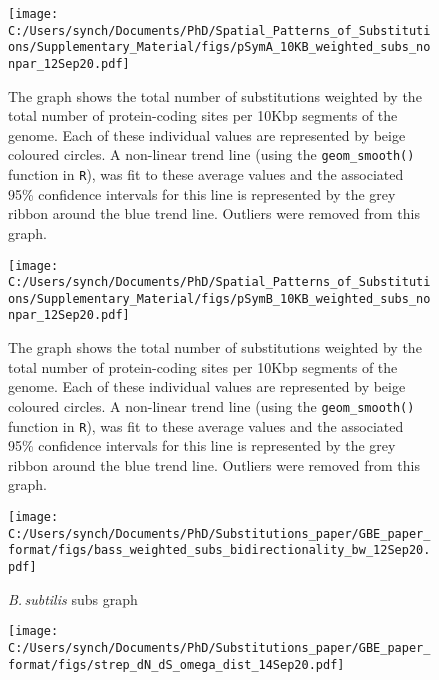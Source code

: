 \documentclass[12pt]{article}
\newcommand{\bass}{\textit{B.\,subtilis}\xspace}
\begin{document}
\begin{figure}[h]
	\begin{center}
		\texttt{[image: C:/Users/synch/Documents/PhD/Spatial\_Patterns\_of\_Substitutions/Supplementary\_Material/figs/pSymA\_10KB\_weighted\_subs\_nonpar\_12Sep20.pdf]}
		\caption{\label{fig:pSymA_nonpar}The graph shows the total number of substitutions weighted by the total number of protein-coding sites per 10Kbp segments of the genome. Each of these individual values are represented by beige coloured circles. A non-linear trend line (using the \texttt{geom\_smooth()} function in \texttt{R}), was fit to these average values and the associated 95\% confidence intervals for this line is represented by the grey ribbon around the blue trend line. Outliers were removed from this graph.}
	\end{center}
\end{figure}

\begin{figure}[h]
	\begin{center}
		\texttt{[image: C:/Users/synch/Documents/PhD/Spatial\_Patterns\_of\_Substitutions/Supplementary\_Material/figs/pSymB\_10KB\_weighted\_subs\_nonpar\_12Sep20.pdf]}
		\caption{\label{fig:pSymB_nonpar}The graph shows the total number of substitutions weighted by the total number of protein-coding sites per 10Kbp segments of the genome. Each of these individual values are represented by beige coloured circles. A non-linear trend line (using the \texttt{geom\_smooth()} function in \texttt{R}), was fit to these average values and the associated 95\% confidence intervals for this line is represented by the grey ribbon around the blue trend line. Outliers were removed from this graph.}
	\end{center}
\end{figure}


\begin{figure}[h]
	\begin{center}
		\texttt{[image: C:/Users/synch/Documents/PhD/Substitutions\_paper/GBE\_paper\_format/figs/bass\_weighted\_subs\_bidirectionality\_bw\_12Sep20.pdf]}
		\caption{\label{fig:bass_subs_bar} \bass subs graph}
	\end{center}
\end{figure}

\begin{figure}[h]
	\begin{center}
		\texttt{[image: C:/Users/synch/Documents/PhD/Substitutions\_paper/GBE\_paper\_format/figs/strep\_dN\_dS\_omega\_dist\_14Sep20.pdf]}
		\caption{\label{fig:strep_selection}}
	\end{center}
\end{figure}
\end{document}
